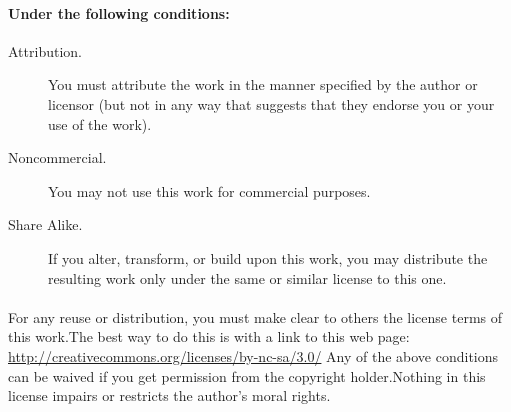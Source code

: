 \documentclass[11pt,titlepage]{book}
\begin{document}
\begin{appendices}
\paragraph{Under the following conditions:}
\begin{description}
\item[Attribution.]{You must attribute the work in the manner specified by the author or licensor (but not in any way that suggests that they endorse you or your use of the work).}
\item[Noncommercial.]{You may not use this work for commercial purposes.}
\item[Share Alike.]{If you alter, transform, or build upon this work, you may distribute the resulting work only under the same or similar license to this one.}
\end{description}
\paragraph{}For any reuse or distribution, you must make clear to others the license terms of this work.\linebreak The best way to do this is with a link to this web page: \url{http://creativecommons.org/licenses/by-nc-sa/3.0/} \linebreak Any of the above conditions can be waived if you get permission from the copyright holder.\linebreak Nothing in this license impairs or restricts the author's moral rights.

\end{appendices}
\end{document}
